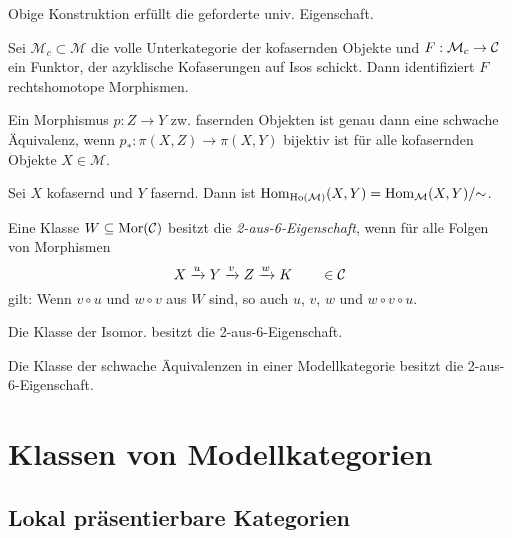 \documentclass{cheat-sheet}
\newcommand{\ModC}{\mathcal{M}} %
\DeclareMathOperator{\Ho}{Ho} %
\begin{document}
\begin{lem}
  Obige Konstruktion erfüllt die geforderte univ. Eigenschaft.
\end{lem}

\begin{lem}
  Sei $\ModC_c \subset \ModC$ die volle Unterkategorie der kofasernden Objekte und $F : \ModC_c \to \Cat$ ein Funktor, der azyklische Kofaserungen auf Isos schickt. Dann identifiziert $F$ rechtshomotope Morphismen.
\end{lem}

\begin{thm}
  Ein Morphismus $p : Z \to Y$ zw. fasernden Objekten ist genau dann eine schwache Äquivalenz, wenn $p_* : \pi(X, Z) \to \pi(X, Y)$ bijektiv ist für alle kofasernden Objekte $X \in \ModC$.
\end{thm}

\begin{beob}
  Sei $X$ kofasernd und $Y$ fasernd. Dann ist $\Hom_{\Ho(\ModC)}(X, Y) = \Hom_\ModC(X, Y)/{\sim}$.
\end{beob}

\begin{defn}
  Eine Klasse $W \subseteq \operatorname{Mor}(\mathcal{C})$ besitzt die \emph{2-aus-6-Eigenschaft}, wenn für alle Folgen von Morphismen
  \[ X \xrightarrow{u} Y \xrightarrow{v} Z \xrightarrow{w} K \qquad \in \mathcal{C} \]
  gilt: Wenn $v \circ u$ und $w \circ v$ aus $W$ sind, so auch $u$, $v$, $w$ und $w \circ v \circ u$.
\end{defn}

\begin{beob}
  Die Klasse der Isomor. besitzt die 2-aus-6-Eigenschaft.
\end{beob}

\begin{kor}
  Die Klasse der schwache Äquivalenzen in einer Modellkategorie besitzt die 2-aus-6-Eigenschaft.
\end{kor}

\section{Klassen von Modellkategorien}

\subsection{Lokal präsentierbare Kategorien}

\end{document}
